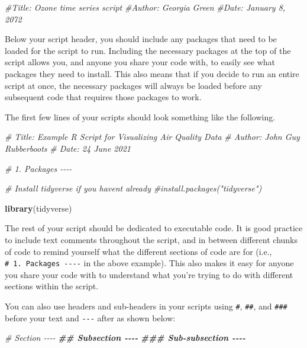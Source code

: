 \documentclass[
]{book}
\newenvironment{Shaded}{\begin{snugshade}}{\end{snugshade}}
\newcommand{\CommentTok}[1]{\textcolor[rgb]{0.56,0.35,0.01}{\textit{#1}}}
\newcommand{\DocumentationTok}[1]{\textcolor[rgb]{0.56,0.35,0.01}{\textbf{\textit{#1}}}}
\newcommand{\FunctionTok}[1]{\textcolor[rgb]{0.13,0.29,0.53}{\textbf{#1}}}
\newcommand{\NormalTok}[1]{#1}
\begin{document}
\begin{Shaded}
\begin{Highlighting}[]
\CommentTok{\#Title: Ozone time series script}
\CommentTok{\#Author: Georgia Green}
\CommentTok{\#Date: January 8, 2072}
\end{Highlighting}
\end{Shaded}

Below your script header, you should include any packages that need to be loaded for the script to run. Including the necessary packages at the top of the script allows you, and anyone you share your code with, to easily see what packages they need to install. This also means that if you decide to run an entire script at once, the necessary packages will always be loaded before any subsequent code that requires those packages to work.

The first few lines of your scripts should look something like the following.

\begin{Shaded}
\begin{Highlighting}[]
\CommentTok{\# Title: Example R Script for Visualizing Air Quality Data }
\CommentTok{\# Author: John Guy Rubberboots}
\CommentTok{\# Date: 24 June 2021}

\CommentTok{\# 1. Packages {-}{-}{-}{-} }

\CommentTok{\# Install tidyverse if you haven\textquotesingle{}t already }
\CommentTok{\#install.packages("tidyverse")}

\FunctionTok{library}\NormalTok{(tidyverse)}
\end{Highlighting}
\end{Shaded}

The rest of your script should be dedicated to executable code. It is good practice to include text comments throughout the script, and in between different chunks of code to remind yourself what the different sections of code are for (i.e., \texttt{\#\ 1.\ Packages\ -\/-\/-\/-} in the above example). This also makes it easy for anyone you share your code with to understand what you're trying to do with different sections within the script.

You can also use headers and sub-headers in your scripts using \texttt{\#}, \texttt{\#\#}, and \texttt{\#\#\#} before your text and \texttt{-\/-\/-} after as shown below:

\begin{Shaded}
\begin{Highlighting}[]
\CommentTok{\# Section {-}{-}{-}{-}}
\DocumentationTok{\#\# Subsection {-}{-}{-}{-}}
\DocumentationTok{\#\#\# Sub{-}subsection {-}{-}{-}{-}}
\end{Highlighting}
\end{Shaded}
\end{document}
